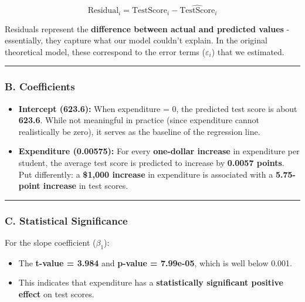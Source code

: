 \documentclass[
  12pt,
  letterpaper,
]{scrbook}
\providecommand{\tightlist}{%
  \setlength{\itemsep}{0pt}\setlength{\parskip}{0pt}}
\renewcommand{\tightlist}{\setlength{\itemsep}{0.5\baselineskip}\setlength{\parskip}{0.2\baselineskip}}
\theoremstyle{plain}
\theoremstyle{definition}
\theoremstyle{remark}
\begin{document}
\[
\text{Residual}_i = \text{TestScore}_i - \widehat{\text{TestScore}}_i
\]

Residuals represent the \textbf{difference between actual and predicted
values} - essentially, they capture what our model couldn't explain. In
the original theoretical model, these correspond to the error terms
(\(\varepsilon_i\)) that we estimated.

\begin{center}\rule{0.5\linewidth}{0.5pt}\end{center}

\subsubsection{\texorpdfstring{B.
\textbf{Coefficients}}{B. Coefficients}}\label{b.-coefficients}

\begin{itemize}
\item
  \textbf{Intercept (623.6):} When expenditure = 0, the predicted test
  score is about \textbf{623.6}. While not meaningful in practice (since
  expenditure cannot realistically be zero), it serves as the baseline
  of the regression line.
\item
  \textbf{Expenditure (0.00575):} For every \textbf{one-dollar increase}
  in expenditure per student, the average test score is predicted to
  increase by \textbf{0.0057 points}. Put differently: a
  \textbf{{\$1,000} increase} in expenditure is associated with a
  \textbf{5.75-point increase} in test scores.
\end{itemize}

\begin{center}\rule{0.5\linewidth}{0.5pt}\end{center}

\subsubsection{\texorpdfstring{C. \textbf{Statistical
Significance}}{C. Statistical Significance}}\label{c.-statistical-significance}

For the slope coefficient (\(\beta_1\)):

\begin{itemize}
\tightlist
\item
  The \textbf{t-value = 3.984} and \textbf{p-value = 7.99e-05}, which is
  well below 0.001.
\item
  This indicates that expenditure has a \textbf{statistically
  significant positive effect} on test scores.
\end{itemize}
\end{document}
